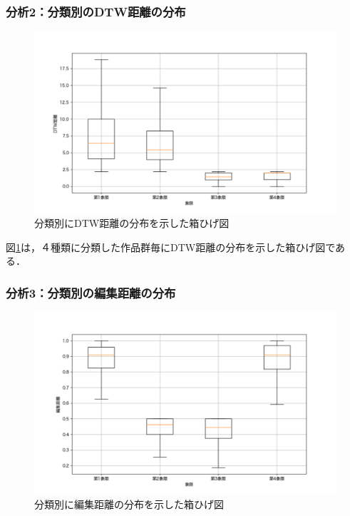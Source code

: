 \documentclass[T,J]{fose} %
\begin{document}
\subsubsection{分析2：分類別のDTW距離の分布}
\begin{figure}[t]
	\centering
	\includegraphics[width=1.0\linewidth]{Okamoto_fig/DTW-out.pdf}
	\caption{分類別にDTW距離の分布を示した箱ひげ図}
	\label{fig:dtw-boxplot}
\end{figure}

図\ref{fig:dtw-boxplot}は，４種類に分類した作品群毎にDTW距離の分布を示した箱ひげ図である．

\subsubsection{分析3：分類別の編集距離の分布}
\begin{figure}[t]
	\centering
	\includegraphics[width=1.0\linewidth]{Okamoto_fig/distance-out.pdf}
	\caption{分類別に編集距離の分布を示した箱ひげ図}
	\label{fig:distance-boxplot}
\end{figure}
\end{document}
